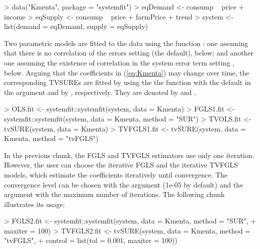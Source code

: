 \begin{Schunk}
\begin{Sinput}
> data("Kmenta", package = "systemfit")
> eqDemand <- consump ~ price + income
> eqSupply <- consump ~ price + farmPrice + trend
> system <- list(demand = eqDemand, supply = eqSupply)
\end{Sinput}
\end{Schunk}

Two parametric models are fitted to the data using the function : one assuming that there is no correlation of the errors setting (the default),  below; and another one assuming the existence of correlation in the system error term setting ,  below. Arguing that the coefficients in (\ref{eq:Kmenta}) may change over time, the corresponding TVSUREs are fitted by using the the function  with the default in the argument  and by , respectively. They are denoted  by  and . 

\begin{Schunk}
\begin{Sinput}
> OLS.fit <- systemfit::systemfit(system, data = Kmenta)
> FGLS1.fit <- systemfit::systemfit(system, data = Kmenta, method = "SUR")
> TVOLS.fit <- tvSURE(system, data = Kmenta)
> TVFGLS1.fit <- tvSURE(system, data = Kmenta, method = "tvFGLS")
\end{Sinput}
\end{Schunk}


In the previous chunk, the FGLS and TVFGLS estimators use only one iteration. However, the user can choose the iterative FGLS and the iterative TVFGLS models, which estimate the coefficients iteratively until convergence. The convergence level can be chosen with the argument  (1e-05 by default) and the argument  with the maximum number of iterations. The following chunk illustrates its usage:

\begin{Schunk}
\begin{Sinput}
> FGLS2.fit <- systemfit::systemfit(system, data = Kmenta, method = "SUR", 
+                                   maxiter = 100)
> TVFGLS2.fit <- tvSURE(system, data = Kmenta, method = "tvFGLS",
+                       control = list(tol = 0.001, maxiter = 100))
\end{Sinput}
\end{Schunk}

